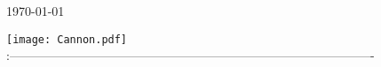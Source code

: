 \begin{titlepage}
	
	
	\vfill\vfill\vfill %
	
	{\large\today} %
	
	
	\vfill\vfill
	\texttt{[image: Cannon.pdf]}\\[1cm] %
	 
	:----------------------------------------------------------------------------------------
	
	\vfill %
\end{titlepage}
